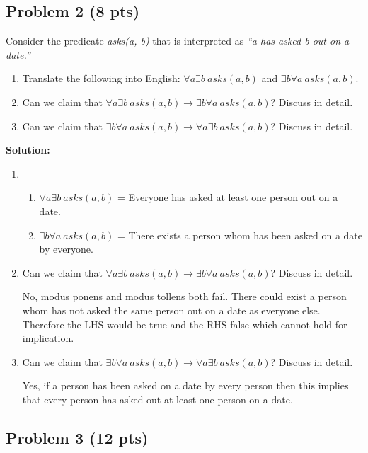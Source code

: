 \documentclass[12pt]{article}
\begin{document}
\subsection{Problem 2 (8 pts)}

Consider the predicate \textit{asks(a, b)} that is interpreted as \textit{``a has asked b out on a date.''}
\begin{enumerate}
\item Translate the following into English: $\forall a \exists b~asks(a, b)$ and $\exists b \forall a ~asks(a, b)$.
\item Can we claim that $\forall a \exists b~asks(a, b) \rightarrow \exists b \forall a ~asks(a, b)$? Discuss in detail.
\item Can we claim that $\exists b \forall a ~asks(a, b) \rightarrow \forall a \exists b~asks(a, b)$? Discuss in detail.
\end{enumerate}

\bigskip
\noindent \textbf{Solution:}
\begin{enumerate}
\item \begin{enumerate}
\item $\forall a \exists b~asks(a, b)$ = Everyone has asked at least one person out on a date.
\item $\exists b \forall a ~asks(a, b)$ = There exists a person whom has been asked on a date by everyone.
\end{enumerate}
\item Can we claim that $\forall a \exists b~asks(a, b) \rightarrow \exists b \forall a ~asks(a, b)$? Discuss in detail.

No, modus ponens and modus tollens both fail. There could exist a person whom has not asked the same person out on a date as everyone else. Therefore the LHS
would be true and the RHS false which cannot hold for implication.

\item Can we claim that $\exists b \forall a ~asks(a, b) \rightarrow \forall a \exists b~asks(a, b)$? Discuss in detail.

Yes, if a person has been asked on a date by every person then this implies that every person has asked out at least one person on a date.
\end{enumerate}




\newpage

\subsection{Problem 3 (12 pts)}
\end{document}
